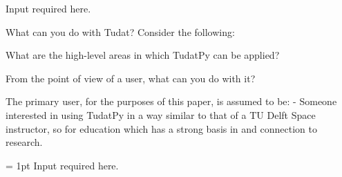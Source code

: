 \lbrack Input required here.\rbrack

What can you do with Tudat?
Consider the following:
\begin{list}{}
    \item What are the high-level areas in which TudatPy can be applied?
    \item From the point of view of a user, what can you do with it?
\end{list}
    
The primary user, for the purposes of this paper, is assumed to be:
- Someone interested in using TudatPy in a way similar to that of a TU Delft Space instructor, so for education which has a strong basis in and connection to research.

\fboxrule = 1pt
    \lbrack Input required here.\rbrack
